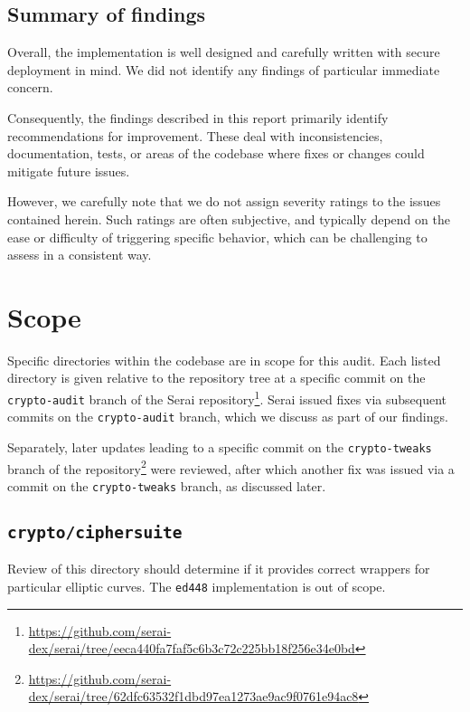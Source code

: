 \documentclass{article}
\begin{document}
\subsection{Summary of findings}

Overall, the implementation is well designed and carefully written with secure deployment in mind.
We did not identify any findings of particular immediate concern.

Consequently, the findings described in this report primarily identify recommendations for improvement.
These deal with inconsistencies, documentation, tests, or areas of the codebase where fixes or changes could mitigate future issues.

However, we carefully note that we do not assign severity ratings to the issues contained herein.
Such ratings are often subjective, and typically depend on the ease or difficulty of triggering specific behavior, which can be challenging to assess in a consistent way.


\section{Scope}

Specific directories within the codebase are in scope for this audit.
Each listed directory is given relative to the repository tree at a specific commit on the \texttt{crypto-audit} branch of the Serai repository\footnote{\url{https://github.com/serai-dex/serai/tree/eeca440fa7faf5c6b3c72c225bb18f256e34e0bd}}.
Serai issued fixes via subsequent commits on the \texttt{crypto-audit} branch, which we discuss as part of our findings.

Separately, later updates leading to a specific commit on the \texttt{crypto-tweaks} branch of the repository\footnote{\url{https://github.com/serai-dex/serai/tree/62dfc63532f1dbd97ea1273ae9ac9f0761e94ac8}} were reviewed, after which another fix was issued via a commit on the \texttt{crypto-tweaks} branch, as discussed later.


\subsection{\texttt{crypto/ciphersuite}}

Review of this directory should determine if it provides correct wrappers for particular elliptic curves.
The \texttt{ed448} implementation is out of scope.
\end{document}
